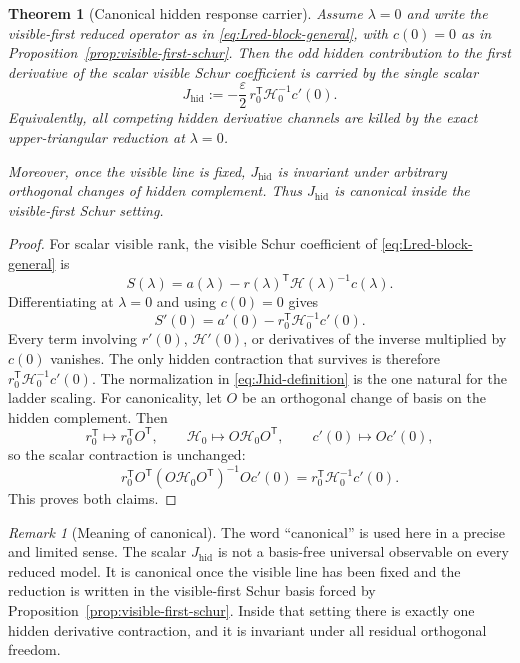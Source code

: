 \documentclass[11pt]{article}
\numberwithin{equation}{section}
\newcommand{\eps}{\varepsilon}
\theoremstyle{thmcompact}
\newtheorem{theorem}{Theorem}[section]
\theoremstyle{remark}
\newtheorem*{remarkplain}{Remark}
\begin{document}
\begin{theorem}[Canonical hidden response carrier]\label{thm:canonical-hidden-carrier}
Assume $\lambda=0$ and write the visible-first reduced operator as in \eqref{eq:Lred-block-general}, with $c(0)=0$ as in Proposition~\ref{prop:visible-first-schur}. Then the odd hidden contribution to the first derivative of the scalar visible Schur coefficient is carried by the single scalar
\begin{equation}\label{eq:Jhid-definition}
J_{\mathrm{hid}} := -\frac{\eps}{2}\, r_0^{\mathsf T}\mathcal H_0^{-1} c'(0).
\end{equation}
Equivalently, all competing hidden derivative channels are killed by the exact upper-triangular reduction at $\lambda=0$.

Moreover, once the visible line is fixed, $J_{\mathrm{hid}}$ is invariant under arbitrary orthogonal changes of hidden complement. Thus $J_{\mathrm{hid}}$ is canonical inside the visible-first Schur setting.
\end{theorem}

\begin{proof}
For scalar visible rank, the visible Schur coefficient of \eqref{eq:Lred-block-general} is
\begin{equation}\label{eq:scalar-schur-lambda}
S(\lambda) = a(\lambda) - r(\lambda)^{\mathsf T}\mathcal H(\lambda)^{-1}c(\lambda).
\end{equation}
Differentiating at $\lambda=0$ and using $c(0)=0$ gives
\begin{equation}\label{eq:scalar-schur-derivative}
S'(0) = a'(0) - r_0^{\mathsf T}\mathcal H_0^{-1}c'(0).
\end{equation}
Every term involving $r'(0)$, $\mathcal H'(0)$, or derivatives of the inverse multiplied by $c(0)$ vanishes. The only hidden contraction that survives is therefore $r_0^{\mathsf T}\mathcal H_0^{-1}c'(0)$. The normalization in \eqref{eq:Jhid-definition} is the one natural for the ladder scaling. For canonicality, let $O$ be an orthogonal change of basis on the hidden complement. Then
\[
r_0^{\mathsf T}\mapsto r_0^{\mathsf T}O^{\mathsf T},
\qquad
\mathcal H_0\mapsto O\mathcal H_0 O^{\mathsf T},
\qquad
c'(0)\mapsto O c'(0),
\]
so the scalar contraction is unchanged:
\[
r_0^{\mathsf T}O^{\mathsf T}(O\mathcal H_0 O^{\mathsf T})^{-1}Oc'(0)
= r_0^{\mathsf T}\mathcal H_0^{-1}c'(0).
\]
This proves both claims.
\end{proof}

\begin{remarkplain}[Meaning of canonical]
The word ``canonical'' is used here in a precise and limited sense. The scalar $J_{\mathrm{hid}}$ is not a basis-free universal observable on every reduced model. It is canonical once the visible line has been fixed and the reduction is written in the visible-first Schur basis forced by Proposition~\ref{prop:visible-first-schur}. Inside that setting there is exactly one hidden derivative contraction, and it is invariant under all residual orthogonal freedom.
\end{remarkplain}
\end{document}
